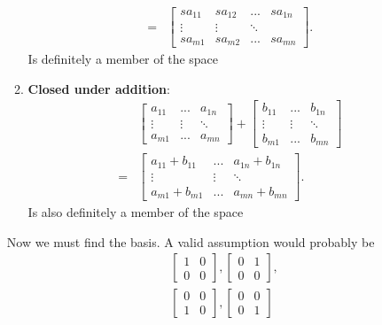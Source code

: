 \documentclass{report}
\begin{document}
\begin{itemize}
\begin{enumerate}
\begin{align*}
                        =&\begin{bmatrix} sa_{11} & sa_{12} & ... & sa_{1n} \\ \vdots & \vdots & \ddots \\ sa_{m1} & sa_{m2} & ... & sa_{mn}\end{bmatrix} 
                    .\end{align*}
                    Is definitely a member of the space
                \item \textbf{Closed under addition}:
                    \begin{align*}
                        &\begin{bmatrix} a_{11} & ... & a_{1n} \\ \vdots & \vdots &\ddots \\ a_{m1} & ... &a_{mn} \end{bmatrix}+ \begin{bmatrix} b_{11} & ... & b_{1n} \\ \vdots & \vdots &\ddots \\ b_{m1} & ... &b_{mn} \end{bmatrix} \\
                        =&\begin{bmatrix}a_{11} + b_{11} & ... & a_{1n} + b_{1n} \\ \vdots & \vdots & \ddots \\ a_{m1} + b_{m1} & ... & a_{mn} + b_{mn} \end{bmatrix}
                    .\end{align*}
                    Is also definitely a member of the space
            \end{enumerate}
            \bigbreak \noindent 
            Now we must find the basis. A valid assumption would probably be
            \begin{align*}
                &\begin{bmatrix}1& 0 \\ 0 &0 \end{bmatrix},  \begin{bmatrix}0& 1 \\ 0 &0 \end{bmatrix}, \\
                                &\begin{bmatrix}0& 0 \\ 1 &0 \end{bmatrix},  \begin{bmatrix}0& 0 \\ 0 &1 \end{bmatrix}

\end{align*}
\end{itemize}
\end{document}
